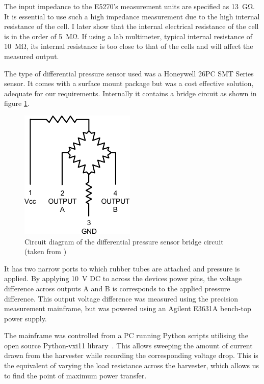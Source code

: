     The input impedance to the E5270's measurement units are specified as \SI{13}{\giga\ohm}.
    It is essential to use such a high impedance measurement due to the high internal resistance of the cell.
    I later show that the internal electrical resistance of the cell is in the order of \SI{5}{\mega\ohm}.
    If using a lab multimeter, typical internal resistance of \SI{10}{\mega\ohm}, its internal resistance is too close to that of the cells and will affect the measured output.

    The type of differential pressure sensor used was a Honeywell 26PC SMT Series sensor.
    It comes with a surface mount package but was a cost effective solution, adequate for our requirements.
    Internally it contains a bridge circuit as shown in figure \ref{fig:PressureSensorSchematic}.
    \begin{figure}
        \centering
        \includegraphics{content/pt1/01-PowerHarvesting/graphics/PressureSensorSchematic}
        \caption{\label{fig:PressureSensorSchematic}Circuit diagram of the differential pressure sensor bridge circuit (taken from \cite{Honeywell2003})}
    \end{figure}
    It has two narrow ports to which rubber tubes are attached and pressure is applied.
    By applying \SI{10}{\volt} DC to across the devices power pins, the voltage difference across outputs A and B is corresponds to the applied pressure difference.
    This output voltage difference was measured using the precision measurement mainframe, but was powered using an Agilent E3631A bench-top power supply.

    The mainframe was controlled from a PC running Python scripts utilising the open source Python-vxi11 library~\cite{Python-ivi2014}.
    This allows sweeping the amount of current drawn from the harvester while recording the corresponding voltage drop.
    This is the equivalent of varying the load resistance across the harvester, which allows us to find the point of maximum power transfer.

